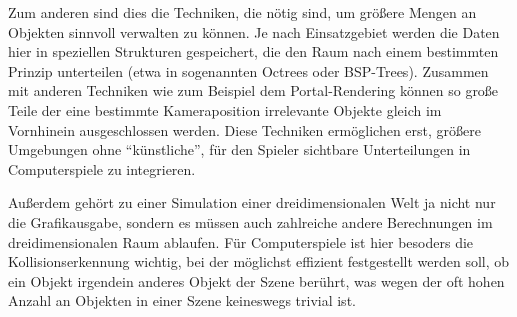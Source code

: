 Zum anderen sind dies die Techniken, die nötig sind, um größere Mengen an Objekten sinnvoll verwalten zu können. Je nach Einsatzgebiet werden die Daten hier in speziellen Strukturen gespeichert, die den Raum nach einem bestimmten Prinzip unterteilen (etwa in sogenannten Octrees oder BSP-Trees). Zusammen mit anderen Techniken wie zum Beispiel dem Portal-Rendering können so große Teile der eine bestimmte Kameraposition irrelevante Objekte gleich im Vornhinein ausgeschlossen werden. Diese Techniken ermöglichen erst, größere Umgebungen ohne \enquote{künstliche}, für den Spieler sichtbare Unterteilungen in Computerspiele zu integrieren.

Außerdem gehört zu einer Simulation einer dreidimensionalen Welt ja nicht nur die Grafikausgabe, sondern es müssen auch zahlreiche andere Berechnungen im dreidimensionalen Raum ablaufen. Für Computerspiele ist hier besoders die Kollisionserkennung wichtig, bei der möglichst effizient festgestellt werden soll, ob ein Objekt irgendein anderes Objekt der Szene berührt, was wegen der oft hohen Anzahl an Objekten in einer Szene keineswegs trivial ist.

\missing